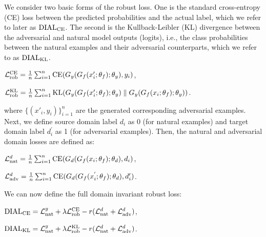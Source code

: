 We consider two basic
forms
of
the robust loss. One is the standard cross-entropy (CE) loss between the predicted probabilities and the actual label, which we refer to later as $\operatorname{DIAL}_{\operatorname{CE}}$. The second is the Kullback-Leibler (KL) divergence between the adversarial and natural model outputs (logits), i.e., the class probabilities between the natural examples and their adversarial counterparts, which we refer to as $\operatorname{DIAL}_{\operatorname{KL}}$.

\begin{center}
$\mathcal{L}_{\operatorname{rob}}^{\operatorname{CE}}= \frac{1}{n}\sum_{i=1}^{n}{\text{CE}(G_y(G_f(x'_i;\theta_f);\theta_y),y_i)}$,

$\mathcal{L}_{\operatorname{rob}}^{\operatorname{KL}}= \frac{1}{n}\sum_{i=1}^{n}{\text{KL}(G_y(G_f(x'_i;\theta_f); \theta_y)  \parallel G_y(G_f(x_i;\theta_f); \theta_y))}$.
\end{center}

where $\{{(x'_{i},y_i)}\}_{i=1}^{n}$ are the generated corresponding adversarial examples. Next, we define source domain label $d_i$ as 0 (for natural examples) and target domain label $d_i^{'}$ as 1 (for adversarial examples). Then, the natural and adversarial domain losses are defined as:

\begin{center}$
\mathcal{L}_{\operatorname{nat}}^d=\frac{1}{n}\sum_{i=1}^{n}{\text{CE}(G_d(G_f(x_i;\theta_f);\theta_d),d_i)}$,

$\mathcal{L}_{\operatorname{adv}}^d=\frac{1}{n}\sum_{i=1}^{n}{\text{CE}(G_d(G_f(x_i^{'};\theta_f);\theta_d),d'_i)}$.
\end{center}

We can now define the full domain invariant robust loss:

\begin{center}
$\operatorname{DIAL}_{\operatorname{CE}} = \mathcal{L}_{\operatorname{nat}}^y + \lambda\mathcal{L}_{\operatorname{rob}}^{\operatorname{CE}} -r(\mathcal{L}_{\operatorname{nat}}^d + \mathcal{L}_{\operatorname{adv}}^d)$,

$\operatorname{DIAL}_{\operatorname{KL}} = \mathcal{L}_{\operatorname{nat}}^y + \lambda\mathcal{L}_{\operatorname{rob}}^{\operatorname{KL}} -r(\mathcal{L}_{\operatorname{nat}}^d + \mathcal{L}_{\operatorname{adv}}^d)$.
\end{center}

